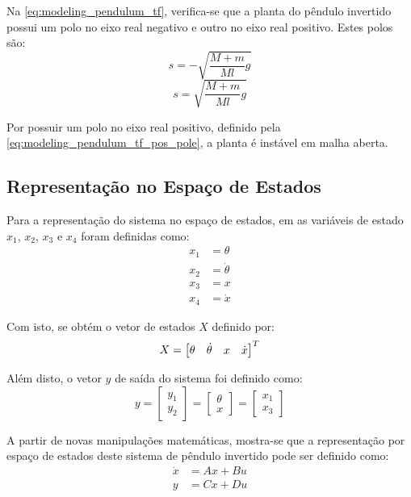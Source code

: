 Na \autoref{eq:modeling_pendulum_tf}, verifica-se que a planta do pêndulo invertido possui um polo no eixo real negativo e outro no eixo real positivo. Estes polos são: 
\begin{equation} \label{eq:modeling_pendulum_tf_neg_pole}
	s = -\sqrt{\frac{M+m}{Ml}g}
\end{equation}
\begin{equation} \label{eq:modeling_pendulum_tf_pos_pole}
	s = \sqrt{\frac{M+m}{Ml}g}
\end{equation}

Por possuir um polo no eixo real positivo, definido pela \autoref{eq:modeling_pendulum_tf_pos_pole}, a planta é instável em malha aberta.

\subsection{Representação no Espaço de Estados}
\label{subsec:sistemas-inverted-pendulum-state-spaces}
Para a representação do sistema no espaço de estados, em \cite[p.~71]{Ogata2010} as variáveis de estado $x_1$, $x_2$, $x_3$ e $x_4$ foram definidas como:
\begin{align*}
	x_1 &= \theta \\
	x_2 &= \dot{\theta} \\
	x_3 &= x \\
	x_4 &= \dot{x}
\end{align*}

Com isto, se obtém o vetor de estados $X$ definido por:
\begin{equation*}
X=
\left[ \begin{array}{@{}*{4}{c}@{}}
     \theta & \dot{\theta} & x & \dot{x} \\
\end{array} \right]^T
\end{equation*}

Além disto, o vetor $y$ de saída do sistema foi definido como:
\[
	y = 
	\begin{bmatrix}
		y_1 \\
		y_2
	\end{bmatrix} = 
	\begin{bmatrix}
			\theta \\
			x
	\end{bmatrix} =
	\begin{bmatrix}
			x_1\\
			x_3
	\end{bmatrix}
\]

A partir de novas manipulações matemáticas, mostra-se que a representação por espaço de estados deste sistema de pêndulo invertido pode ser definido como:
\begin{align} \label{eq:space_state_equation_pendulum}
	\dot{x} &= Ax + Bu \\
	y		&= Cx + Du
\end{align}

